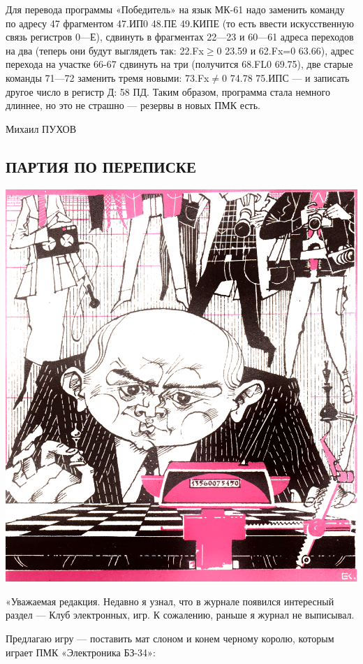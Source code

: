\documentclass[11pt,a4paper,oneside]{article}
\begin{document}
Для перевода программы «Победитель» на язык МК-61 надо заменить команду по адресу 47 фрагментом 47.ИП0 48.ПЕ 49.КИПЕ (то есть ввести искусственную связь регистров 0—Е), сдвинуть в фрагментах 22—23 и 60—61 адреса переходов на два (теперь они будут выглядеть так: 22.Fx$\geq$0 23.59 и 62.Fx=0 63.66), адрес перехода на участке 66-67 сдвинуть на три (получится 68.FL0 69.75), две старые команды 71—72 заменить тремя новыми: 73.Fx$\neq$0 74.78 75.ИПС — и записать другое число в регистр Д: 58 ПД. Таким образом, программа стала немного длиннее, но это не страшно — резервы в новых ПМК есть.

Михаил ПУХОВ

\subsection{ПАРТИЯ ПО ПЕРЕПИСКЕ}
\includegraphics[width=\textwidth]{mail1}

«Уважаемая редакция. Недавно я узнал, что в журнале появился интересный раздел — Клуб электронных, игр. К сожалению, раньше я журнал не выписывал.

Предлагаю игру — поставить мат слоном и конем черному королю, которым играет ПМК «Электроника БЗ-34»:
\end{document}
